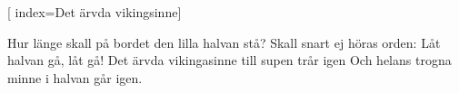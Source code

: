 

[
	index={Det ärvda vikingsinne}]		
	
\beginverse*						
Hur länge skall på bordet
den lilla halvan stå?
Skall snart ej höras orden:
Låt halvan gå, låt gå!
Det ärvda vikingasinne till supen trår igen 
Och helans trogna minne i halvan går igen. 
\endverse									
\vspace{5mm}
\endsong		
